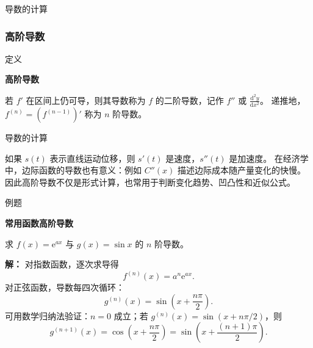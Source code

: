 \documentclass[aspectratio=169,10pt,fontset=fandol]{ctexbeamer}
\newcommand{\dd}{\mathrm{d}}
\newcommand{\ee}{\mathrm{e}}
\begin{document}
\begin{frame}[t,fragile]{导数的计算}
\normalsize
{\normalsize

\subsubsection*{高阶导数}


}
\begin{block}{定义}
{\normalsize
\textbf{高阶导数}\par

若 $f'$ 在区间上仍可导，则其导数称为 $f$ 的二阶导数，记作 $f''$ 或 $\frac{\dd^2y}{\dd x^2}$。 递推地，$f^{(n)}=(f^{(n-1)})'$ 称为 $n$ 阶导数。

}
\end{block}
\end{frame}
\begin{frame}[t,fragile]{导数的计算}
\normalsize
{\normalsize
如果 $s(t)$ 表示直线运动位移，则 $s'(t)$ 是速度，$s''(t)$ 是加速度。 在经济学中，边际函数的导数也有意义：例如 $C''(x)$ 描述边际成本随产量变化的快慢。 因此高阶导数不仅是形式计算，也常用于判断变化趋势、凹凸性和近似公式。


}
\begin{block}{例题}
{\normalsize
\textbf{常用函数高阶导数}\par

求 $f(x)=\ee^{ax}$ 与 $g(x)=\sin x$ 的 $n$ 阶导数。

}
\end{block}
\pause
{\normalsize
\textbf{解：}
对指数函数，逐次求导得
\[
f^{(n)}(x)=a^n\ee^{ax}.
\]
对正弦函数，导数每四次循环：
\[
g^{(n)}(x)=\sin\left(x+\frac{n\pi}{2}\right).
\]
可用数学归纳法验证：$n=0$ 成立；若 $g^{(n)}(x)=\sin(x+n\pi/2)$，则
\[
g^{(n+1)}(x)=\cos\left(x+\frac{n\pi}{2}\right)=\sin\left(x+\frac{(n+1)\pi}{2}\right).
\]

}
\end{frame}
\end{document}
